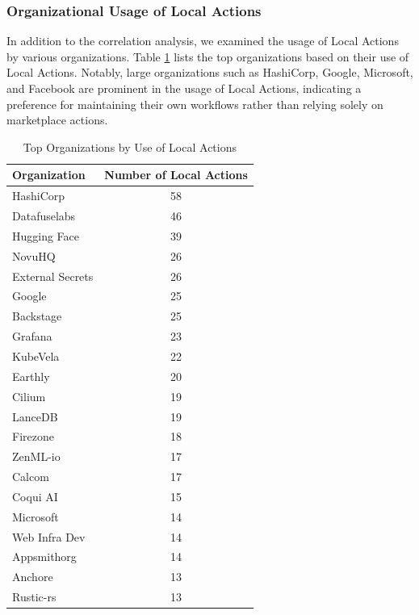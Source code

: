 \documentclass[conference]{IEEEtran}
\begin{document}
      \subsubsection{Organizational Usage of Local Actions}

      In addition to the correlation analysis, we examined the usage of Local Actions by various organizations. Table \ref{tab:org_usage} lists the top organizations based on their use of Local Actions. Notably, large organizations such as HashiCorp, Google, Microsoft, and Facebook are prominent in the usage of Local Actions, indicating a preference for maintaining their own workflows rather than relying solely on marketplace actions.
      \begin{table}[!h]
          \centering
          \caption{Top Organizations by Use of Local Actions}
          \label{tab:org_usage}
          \begin{tabular}{|l|c|}
              \hline
              \textbf{Organization} & \textbf{Number of Local Actions} \\
              \hline
              HashiCorp & 58 \\
              Datafuselabs & 46 \\
              Hugging Face & 39 \\
              NovuHQ & 26 \\
              External Secrets & 26 \\
              Google & 25 \\
              Backstage & 25 \\
              Grafana & 23 \\
              KubeVela & 22 \\
              Earthly & 20 \\
              Cilium & 19 \\
              LanceDB & 19 \\
              Firezone & 18 \\
              ZenML-io & 17 \\
              Calcom & 17 \\
              Coqui AI & 15 \\
              Microsoft & 14 \\
              Web Infra Dev & 14 \\
              Appsmithorg & 14 \\
              Anchore & 13 \\
              Rustic-rs & 13 \\

\end{tabular}
\end{table}
\end{document}

